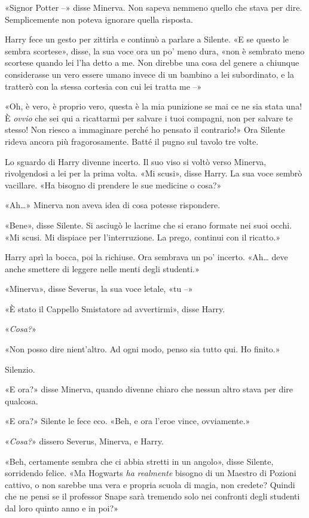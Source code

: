 «Signor Potter –» disse Minerva. Non sapeva nemmeno quello che stava per dire. Semplicemente non poteva ignorare quella risposta.

Harry fece un gesto per zittirla e continuò a parlare a Silente. «E se questo le sembra scortese», disse, la sua voce ora un po’ meno dura, «non è sembrato meno scortese quando lei l’ha detto a me. Non direbbe una cosa del genere a chiunque considerasse un vero essere umano invece di un bambino a lei subordinato, e la tratterò con la stessa cortesia con cui lei tratta me –»

«Oh, è vero, è proprio vero, questa è la mia punizione se mai ce ne sia stata una! È \textit{ovvio} che sei qui a ricattarmi per salvare i tuoi compagni, non per salvare te stesso! Non riesco a immaginare perché ho pensato il contrario!» Ora Silente rideva ancora più fragorosamente. Batté il pugno sul tavolo tre volte.

Lo sguardo di Harry divenne incerto. Il suo viso si voltò verso Minerva, rivolgendosi a lei per la prima volta. «Mi scusi», disse Harry. La sua voce sembrò vacillare. «Ha bisogno di prendere le sue medicine o cosa?»

«Ah…» Minerva non aveva idea di cosa potesse rispondere.

«Bene», disse Silente. Si asciugò le lacrime che si erano formate nei suoi occhi. «Mi scusi. Mi dispiace per l’interruzione. La prego, continui con il ricatto.»

Harry aprì la bocca, poi la richiuse. Ora sembrava un po’ incerto. «Ah… deve anche smettere di leggere nelle menti degli studenti.»

«Minerva», disse Severus, la sua voce letale, «tu –»

«È stato il Cappello Smistatore ad avvertirmi», disse Harry.

«\textit{Cosa?}»

«Non posso dire nient’altro. Ad ogni modo, penso sia tutto qui. Ho finito.»

Silenzio.

«E ora?» disse Minerva, quando divenne chiaro che nessun altro stava per dire qualcosa.

«E ora?» Silente le fece eco. «Beh, e ora l’eroe vince, ovviamente.»

«\textit{Cosa?}» dissero Severus, Minerva, e Harry.

«Beh, certamente sembra che ci abbia stretti in un angolo», disse Silente, sorridendo felice. «Ma Hogwarts \textit{ha realmente} bisogno di un Maestro di Pozioni cattivo, o non sarebbe una vera e propria scuola di magia, non credete? Quindi che ne pensi se il professor Snape sarà tremendo solo nei confronti degli studenti dal loro quinto anno e in poi?»

